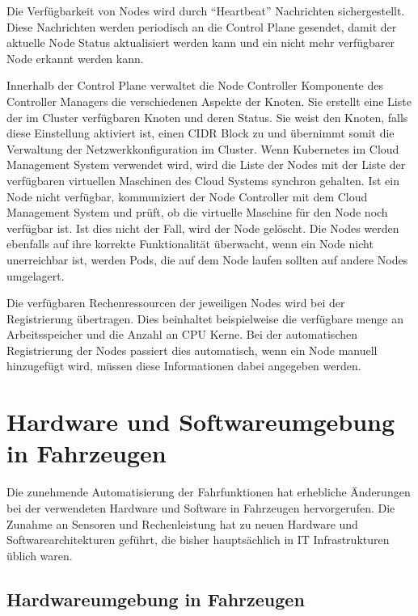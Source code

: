 Die Verfügbarkeit von Nodes wird durch \enquote{Heartbeat} Nachrichten sichergestellt. Diese Nachrichten werden periodisch an die Control Plane gesendet, damit der aktuelle Node Status aktualisiert werden kann und ein nicht mehr verfügbarer Node erkannt werden kann. 

Innerhalb der Control Plane verwaltet die Node Controller Komponente des Controller Managers die verschiedenen Aspekte der Knoten. Sie erstellt eine Liste der im Cluster verfügbaren Knoten und deren Status. Sie weist den Knoten, falls diese Einstellung aktiviert ist, einen \gls{CIDR} Block zu und übernimmt somit die Verwaltung der Netzwerkkonfiguration im Cluster. Wenn Kubernetes im Cloud Management System verwendet wird, wird die Liste der Nodes mit der Liste der verfügbaren virtuellen Maschinen des Cloud Systems synchron gehalten. Ist ein Node nicht verfügbar, kommuniziert der Node Controller mit dem Cloud Management System und prüft, ob die virtuelle Maschine für den Node noch verfügbar ist. Ist dies nicht der Fall, wird der Node gelöscht. Die Nodes werden ebenfalls auf ihre korrekte Funktionalität überwacht, wenn ein Node nicht unerreichbar ist, werden Pods, die auf dem Node laufen sollten auf andere Nodes umgelagert. 

Die verfügbaren Rechenressourcen der jeweiligen Nodes wird bei der Registrierung übertragen. Dies beinhaltet beispielweise die verfügbare menge an Arbeitsspeicher und die Anzahl an CPU Kerne. Bei der automatischen Registrierung der Nodes passiert dies automatisch, wenn ein Node manuell hinzugefügt wird, müssen diese Informationen dabei angegeben werden. 

\section{Hardware und Softwareumgebung in Fahrzeugen}

Die zunehmende Automatisierung der Fahrfunktionen hat erhebliche Änderungen bei der verwendeten Hardware und Software in Fahrzeugen hervorgerufen. Die Zunahme an Sensoren und Rechenleistung hat zu neuen Hardware und Softwarearchitekturen geführt, die bisher hauptsächlich in IT Infrastrukturen üblich waren. 

\subsection{Hardwareumgebung in Fahrzeugen}

